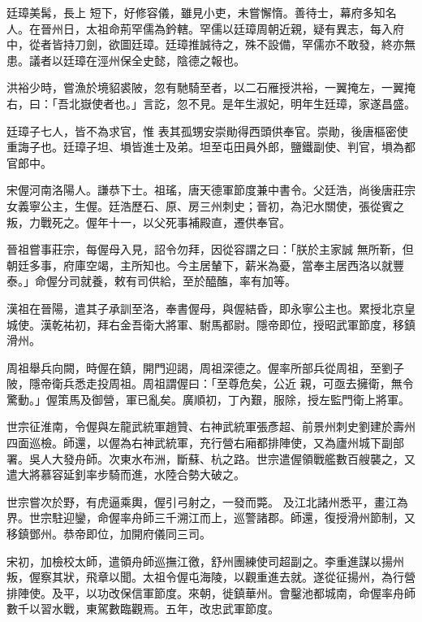 \begin{pinyinscope}
 廷璋美髯，長上
 短下，好修容儀，雖見小吏，未嘗懈惰。善待士，幕府多知名人。在晉州日，太祖命荊罕儒為鈐轄。罕儒以廷璋周朝近親，疑有異志，每入府中，從者皆持刀劍，欲圖廷璋。廷璋推誠待之，殊不設備，罕儒亦不敢發，終亦無患。議者以廷璋在涇州保全史懿，陰德之報也。



 洪裕少時，嘗漁於境貂裘陂，忽有馳騎至者，以二石雁授洪裕，一翼掩左，一翼掩右，曰：「吾北嶽使者也。」言訖，忽不見。是年生淑妃，明年生廷璋，家遂昌盛。



 廷璋子七人，皆不為求官，惟
 表其孤甥安崇勛得西頭供奉官。崇勛，後唐樞密使重誨子也。廷璋子坦、塤皆進士及弟。坦至屯田員外郎，鹽鐵副使、判官，塤為都官郎中。



 宋偓河南洛陽人。謙恭下士。祖瑤，唐天德軍節度兼中書令。父廷浩，尚後唐莊宗女義寧公主，生偓。廷浩歷石、原、房三州刺史；晉初，為汜水關使，張從賓之叛，力戰死之。偓年十一，以父死事補殿直，遷供奉官。



 晉祖嘗事莊宗，每偓母入見，詔令勿拜，因從容謂之曰：「朕於主家誠
 無所靳，但朝廷多事，府庫空竭，主所知也。今主居輦下，薪米為憂，當奉主居西洛以就豐泰。」命偓分司就養，敕有司供給，至於醯醢，率有加等。



 漢祖在晉陽，遣其子承訓至洛，奉書偓母，與偓結昏，即永寧公主也。累授北京皇城使。漢乾祐初，拜右金吾衛大將軍、駙馬都尉。隱帝即位，授昭武軍節度，移鎮滑州。



 周祖舉兵向闕，時偓在鎮，開門迎謁，周祖深德之。偓率所部兵從周祖，至劉子陂，隱帝衛兵悉走投周祖。周祖謂偓曰：「至尊危矣，公近
 親，可亟去擁衛，無令驚動。」偓策馬及御營，軍已亂矣。廣順初，丁內艱，服除，授左監門衛上將軍。



 世宗征淮南，令偓與左龍武統軍趙贊、右神武統軍張彥超、前景州刺史劉建於壽州四面巡檢。師還，以偓為右神武統軍，充行營右廂都排陣使，又為廬州城下副部署。吳人大發舟師。次東水布洲，斷蘇、杭之路。世宗遣偓領戰艦數百艘襲之，又遣大將慕容延釗率步騎而進，水陸合勢大破之。



 世宗嘗次於野，有虎逼乘輿，偓引弓射之，一發而斃。
 及江北諸州悉平，畫江為界。世宗駐迎鑾，命偓率舟師三千溯江而上，巡警諸郡。師還，復授滑州節制，又移鎮鄧州。恭帝即位，加開府儀同三司。



 宋初，加檢校太師，遣領舟師巡撫江徼，舒州團練使司超副之。李重進謀以揚州叛，偓察其狀，飛章以聞。太祖令偓屯海陵，以觀重進去就。遂從征揚州，為行營排陣使。及平，以功改保信軍節度。來朝，徙鎮華州。會鑿池都城南，命偓率舟師數千以習水戰，東駕數臨觀焉。五年，改忠武軍節度。




\end{pinyinscope}
